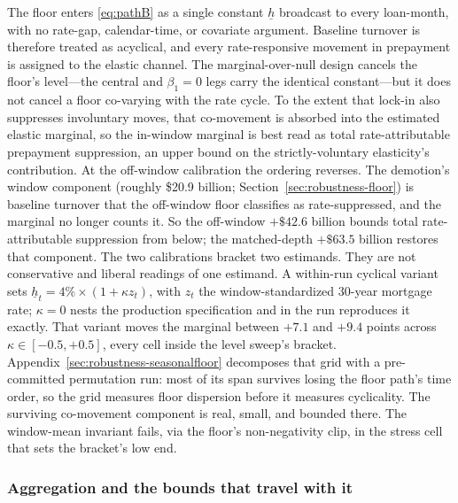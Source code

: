 The floor enters \eqref{eq:pathB} as a single constant $\underline{h}$ broadcast to every loan-month, with no rate-gap, calendar-time, or covariate argument. Baseline turnover is therefore treated as acyclical, and every rate-responsive movement in prepayment is assigned to the elastic channel. The marginal-over-null design cancels the floor's level---the central and $\beta_1 = 0$ legs carry the identical constant---but it does not cancel a floor co-varying with the rate cycle. To the extent that lock-in also suppresses involuntary moves, that co-movement is absorbed into the estimated elastic marginal, so the in-window marginal is best read as total rate-attributable prepayment suppression, an upper bound on the strictly-voluntary elasticity's contribution. At the off-window calibration the ordering reverses. The demotion's window component (roughly \$20.9 billion; Section~\ref{sec:robustness-floor}) is baseline turnover that the off-window floor classifies as rate-suppressed, and the marginal no longer counts it. So the off-window $+\$42.6$ billion bounds total rate-attributable suppression from below; the matched-depth $+\$63.5$ billion restores that component. The two calibrations bracket two estimands. They are not conservative and liberal readings of one estimand. A within-run cyclical variant sets $\underline{h}_t = 4\% \times (1 + \kappa z_t)$, with $z_t$ the window-standardized 30-year mortgage rate; $\kappa = 0$ nests the production specification and in the run reproduces it exactly. That variant moves the marginal between $+7.1$ and $+9.4$ points across $\kappa \in [-0.5, +0.5]$, every cell inside the level sweep's bracket. Appendix~\ref{sec:robustness-seasonalfloor} decomposes that grid with a pre-committed permutation run: most of its span survives losing the floor path's time order, so the grid measures floor dispersion before it measures cyclicality. The surviving co-movement component is real, small, and bounded there. The window-mean invariant fails, via the floor's non-negativity clip, in the stress cell that sets the bracket's low end.

\subsubsection{Aggregation and the bounds that travel with it}

